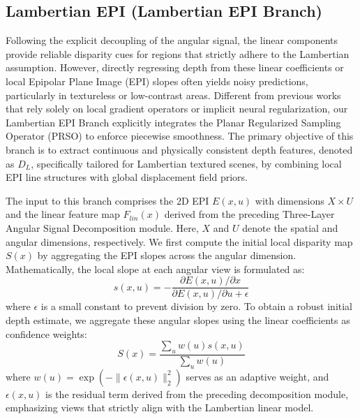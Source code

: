 \subsection{Lambertian EPI (Lambertian EPI Branch)}

Following the explicit decoupling of the angular signal, the linear components provide reliable disparity cues for regions that strictly adhere to the Lambertian assumption. However, directly regressing depth from these linear coefficients or local Epipolar Plane Image (EPI) slopes often yields noisy predictions, particularly in textureless or low-contrast areas. Different from previous works that rely solely on local gradient operators or implicit neural regularization, our Lambertian EPI Branch explicitly integrates the Planar Regularized Sampling Operator (PRSO) to enforce piecewise smoothness. The primary objective of this branch is to extract continuous and physically consistent depth features, denoted as $D_L$, specifically tailored for Lambertian textured scenes, by combining local EPI line structures with global displacement field priors.

The input to this branch comprises the 2D EPI $E(x, u)$ with dimensions $X \times U$ and the linear feature map $F_{lin}(x)$ derived from the preceding Three-Layer Angular Signal Decomposition module. Here, $X$ and $U$ denote the spatial and angular dimensions, respectively. We first compute the initial local disparity map $S(x)$ by aggregating the EPI slopes across the angular dimension. Mathematically, the local slope at each angular view is formulated as:
\begin{equation}
\label{eq:eq8}
s(x, u) = -\frac{\partial E(x, u) / \partial x}{\partial E(x, u) / \partial u + \epsilon}
\end{equation}
where $\epsilon$ is a small constant to prevent division by zero. To obtain a robust initial depth estimate, we aggregate these angular slopes using the linear coefficients as confidence weights:
\begin{equation}
\label{eq:eq9}
S(x) = \frac{\sum_{u} w(u) s(x, u)}{\sum_{u} w(u)}
\end{equation}
where $w(u) = \exp(-\| \epsilon(x, u) \|_2^2)$ serves as an adaptive weight, and $\epsilon(x, u)$ is the residual term derived from the preceding decomposition module, emphasizing views that strictly align with the Lambertian linear model.

